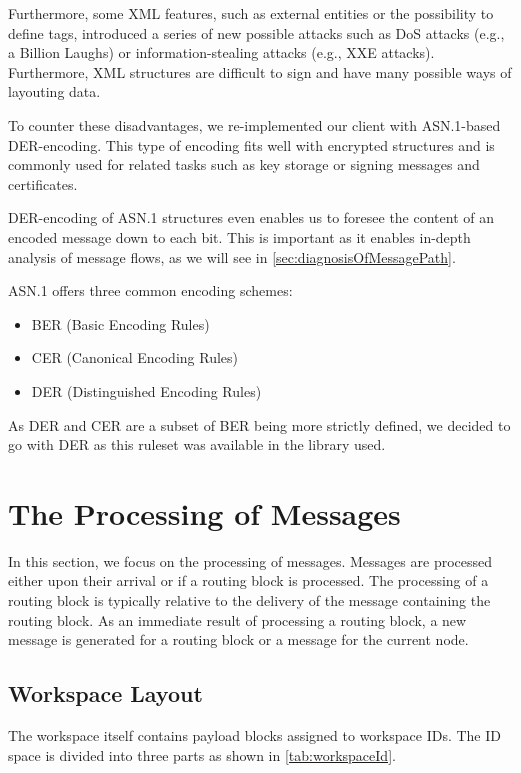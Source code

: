 Furthermore, some XML features, such as external entities or the possibility to define tags, introduced a series of new possible attacks such as DoS attacks (e.g., a Billion Laughs) or information-stealing attacks (e.g., XXE attacks). Furthermore, XML structures are difficult to sign and have many possible ways of layouting data. 

To counter these disadvantages, we re-implemented our client with ASN.1-based DER-encoding. This type of encoding fits well with encrypted structures and is commonly used for related tasks such as key storage or signing messages and certificates.

DER-encoding of ASN.1 structures even enables us to foresee the content of an encoded message down to each bit. This is important as it enables in-depth analysis of message flows, as we will see in \cref{sec:diagnosisOfMessagePath}.

ASN.1 offers three common encoding schemes:
\begin{itemize}
	\item BER (Basic Encoding Rules)
	\item CER (Canonical Encoding Rules)
	\item DER (Distinguished Encoding Rules)
\end{itemize}

As DER and CER are a subset of BER being more strictly defined, we decided to go with DER as this ruleset was available in the library used.

\section{The Processing of Messages\label{sec:messageProcessing}}
In this section, we focus on the processing of messages. Messages are processed either upon their arrival or if a routing block is processed. The processing of a routing block is typically relative to the delivery of the message containing the routing block. As an immediate result of processing a routing block, a new message is generated for a routing block or a message for the current node.

\subsection{Workspace Layout}
The workspace itself contains payload blocks assigned to workspace IDs. The ID space is divided into three parts as shown in \cref{tab:workspaceId}.

